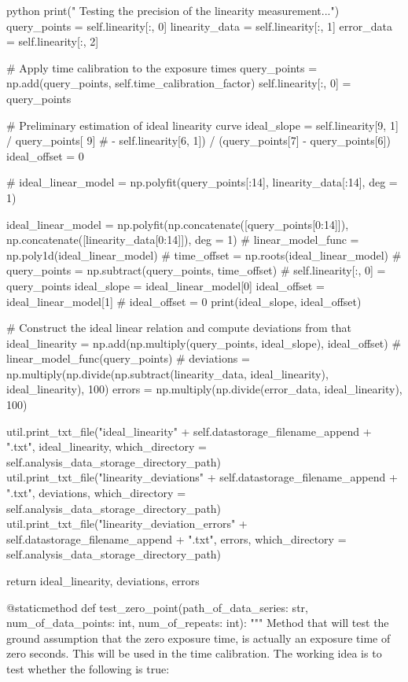 \documentclass[../main.tex]{subfiles}
\begin{document}
\begin{mintedbox}{python}
print(" Testing the precision of the linearity measurement...")
query_points  =  self.linearity[:, 0]
linearity_data  =  self.linearity[:, 1]
error_data  =  self.linearity[:, 2]

# Apply time calibration to the exposure times
query_points  =  np.add(query_points, self.time_calibration_factor)
self.linearity[:, 0]  =  query_points

# Preliminary estimation of ideal linearity curve
ideal_slope  =  self.linearity[9, 1] / query_points[
9]  # - self.linearity[6, 1]) / (query_points[7] - query_points[6])
ideal_offset  =  0

# ideal_linear_model             =    np.polyfit(query_points[:14], linearity_data[:14], deg = 1)

ideal_linear_model  =  np.polyfit(np.concatenate([query_points[0:14]]), np.concatenate([linearity_data[0:14]]),
deg = 1)
# linear_model_func        =    np.poly1d(ideal_linear_model)
# time_offset              =    np.roots(ideal_linear_model)
# query_points             =    np.subtract(query_points, time_offset)
# self.linearity[:, 0]     =    query_points
ideal_slope  =  ideal_linear_model[0]
ideal_offset  =  ideal_linear_model[1]
# ideal_offset  =  0
print(ideal_slope, ideal_offset)

# Construct the ideal linear relation and compute deviations from that
ideal_linearity  =  np.add(np.multiply(query_points, ideal_slope),
ideal_offset)  # linear_model_func(query_points)  #
deviations  =  np.multiply(np.divide(np.subtract(linearity_data, ideal_linearity), ideal_linearity), 100)
errors  =  np.multiply(np.divide(error_data, ideal_linearity), 100)

util.print_txt_file("ideal_linearity" + self.datastorage_filename_append + ".txt", ideal_linearity,
which_directory = self.analysis_data_storage_directory_path)
util.print_txt_file("linearity_deviations" + self.datastorage_filename_append + ".txt", deviations,
which_directory = self.analysis_data_storage_directory_path)
util.print_txt_file("linearity_deviation_errors" + self.datastorage_filename_append + ".txt", errors,
which_directory = self.analysis_data_storage_directory_path)

return ideal_linearity, deviations, errors

@staticmethod
def test_zero_point(path_of_data_series: str, num_of_data_points: int, num_of_repeats: int):
"""
Method that will test the ground assumption that the zero exposure time, is actually
an exposure time of zero seconds. This will be used in the time calibration. The working
idea is to test whether the following is true:


\end{mintedbox}
\end{document}
